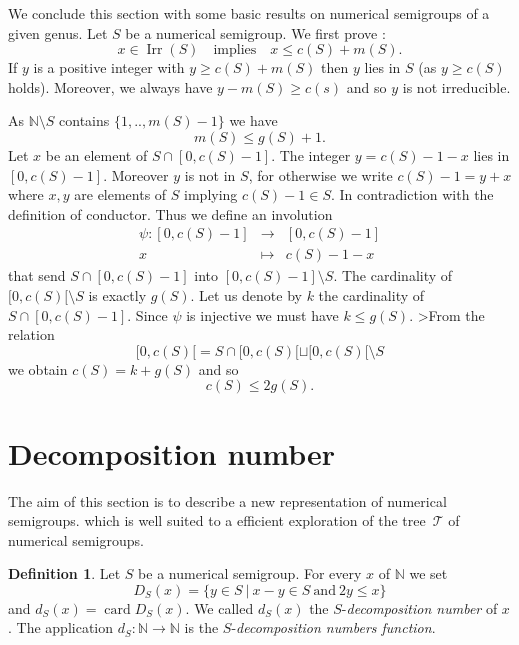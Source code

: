 \documentclass[reqno,11pt]{amsart}
\theoremstyle{plain}
\theoremstyle{definition}
\newtheorem{defi}[prop]{Definition}
\renewcommand{\leq}{\leqslant}
\renewcommand{\geq}{\geqslant}
\newcommand{\NN}{\mathbb{N}}
\DeclareMathOperator{\Irr}{Irr}
\DeclareMathOperator{\card}{card}
\begin{document}
We conclude this section with some basic results on numerical semigroups of a given genus.
Let $S$ be a numerical semigroup. 
We first prove :
\begin{equation}
\label{E:Irr}
x\in \Irr(S)\quad\textrm{implies}\quad x\leq c(S)+m(S).
\end{equation}
If $y$ is a positive integer with $y \geq c(S)+m(S)$ then $y$ lies in $S$ (as $y\geq c(S)$ holds). Moreover, we always have $y-m(S)\geq c(s)$ and so $y$ is not irreducible.

As $\NN\setminus{S}$ contains $\{1,..,m(S)-1\}$ we have 
\begin{equation}
\label{E:m}
m(S)\leq g(S)+1.
\end{equation}
Let $x$ be an element of $S\cap[0,c(S)-1]$. 
The integer $y=c(S)-1-x$ lies in $[0,c(S)-1]$. 
Moreover $y$ is not in $S$, for otherwise  we write $c(S)-1=y+x$ where $x,y$ are elements of $S$ implying $c(S)-1\in S$. 
In contradiction with the definition of conductor. 
Thus we define an involution 
\[
\begin{array}{rcl}
\psi:[0,c(S)-1]&\to&[0,c(S)-1]\\
x&\mapsto&c(S)-1-x
\end{array}
\]
that send $S\cap[0,c(S)-1]$ into $[0,c(S)-1]\setminus S$.
The cardinality of $[0,c(S)[\setminus S$ is exactly $g(S)$. Let us denote by $k$ the cardinality  of $S\cap[0,c(S)-1]$. 
Since $\psi$ is injective we must have $k\leq g(S)$. 
>From the relation 
\[
[0,c(S)[=S\cap[0,c(S)[\sqcup[0,c(S)[\setminus S
\]
 we obtain $c(S)=k+g(S)$ and so 
\begin{equation}
\label{E:c}
c(S)\leq 2 g(S).
\end{equation}

\section{Decomposition number}
\label{S:DecNumber}

The aim of this section is to describe a new representation of numerical semigroups.
which is well suited to a efficient exploration of the tree~$\mathcal{T}$ of numerical semigroups. 

\begin{defi}
Let $S$ be a numerical semigroup.
For every $x$ of $\NN$  we set
\[
D_S(x)=\{y \in S\ |\ x-y\in S\ \text{and}\ 2y\leq x\}
\]
and $d_S(x)=\card D_S(x)$.
We called $d_S(x)$ the $S$-\emph{decomposition number} of $x$.
The application $d_S:\NN\to\NN$ is the $S$-\emph{decomposition numbers function}.
\end{defi}
\end{document}
